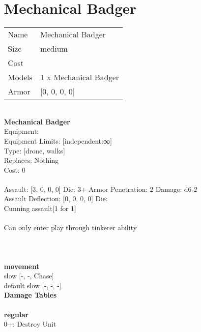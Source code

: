 \pagebreak\pagebreak

\section{ Mechanical Badger }

\begin{tabular}{ll}
  Name & Mechanical Badger \\
  Size & medium\\
  Cost & \\
  Models & 1 x Mechanical Badger\\
  Armor & [0, 0, 0, 0]\\
\end{tabular}

\noindent \\ 


{\bf Mechanical Badger } \\
Equipment:  \\
Equipment Limits: [independent:∞] \\
Type: [drone, walks] \\
Replaces: Nothing \\
Cost: 0\\
\ \\
Assault: [3, 0, 0, 0] Die: 3+ Armor Penetration: 2 Damage: d6-2 \\
Assault Deflection: [0, 0, 0, 0] Die: \\
\indent Cunning assault[1 for 1]\\ 
 
\ \\
Can only enter play through tinkerer ability\\ 

\ \\
 
\ \\



\ \\ {\bf movement } \\
slow [-, -, Chase] \\
default slow [-, -, -] \\


{\bf Damage Tables} \\
\ \\ {\bf regular } \\
0+: Destroy Unit \\










